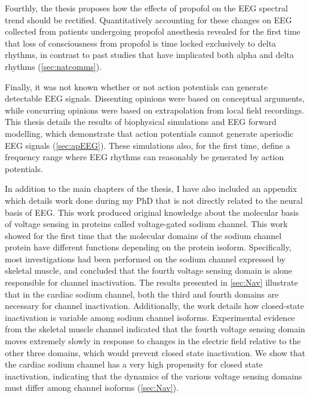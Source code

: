 Fourthly, the thesis proposes how the effects of propofol on the EEG spectral trend should be rectified. Quantitatively accounting for these changes on EEG collected from patients undergoing propofol anesthesia revealed for the first time that loss of consciousness from propofol is time locked exclusively to delta rhythms, in contrast to past studies that have implicated both alpha and delta rhythms  (\autoref{sec:natcomms}).

Finally, it was not known whether or not action potentials can generate detectable EEG signals. Dissenting opinions were based on conceptual arguments, while concurring opinions were based on extrapolation from local field recordings. This thesis details the results of biophysical simulations and EEG forward modelling, which demonstrate that action potentials cannot generate aperiodic EEG signals (\autoref{sec:apEEG}). These simulations also, for the first time, define a frequency range where EEG rhythms can reasonably be generated by action potentials.

In addition to the main chapters of the thesis, I have also included an appendix which details work done during my PhD that is not directly related to the neural basis of EEG. This work produced original knowledge about the molecular basis of voltage sensing in proteins called voltage-gated sodium channel. This work showed for the first time that the molecular domains of the sodium channel protein have different functions depending on the protein isoform. Specifically, most investigations had been performed on the sodium channel expressed by skeletal muscle, and concluded that the fourth voltage sensing domain is alone responsible for channel inactivation. The results presented in \autoref{sec:Nav} illustrate that in the cardiac sodium channel, both the third and fourth domains are necessary for channel inactivation. Additionally, the work details how closed-state inactivation is variable among sodium channel isoforms. Experimental evidence from the skeletal muscle channel indicated that the fourth voltage sensing domain moves extremely slowly in response to changes in the electric field relative to the other three domains, which would prevent closed state inactivation. We show that the cardiac sodium channel has a very high propensity for closed state inactivation, indicating that the dynamics of the various voltage sensing domains must differ among channel isoforms (\autoref{sec:Nav}).

